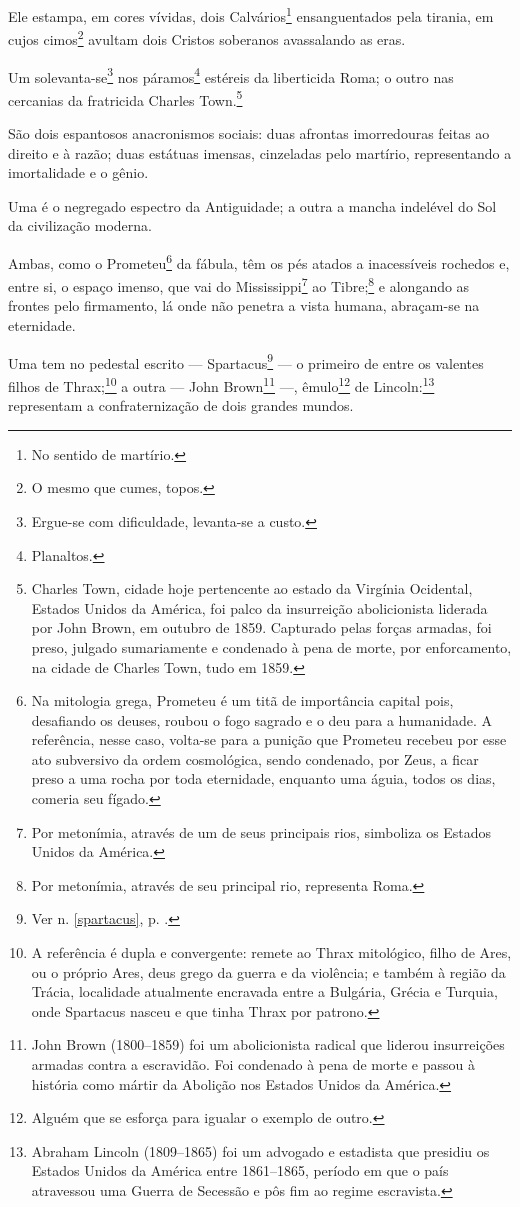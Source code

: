 Ele estampa, em cores vívidas, dois Calvários\footnote{No sentido de
  martírio.} ensanguentados pela tirania, em cujos cimos\footnote{O
  mesmo que cumes, topos.} avultam dois Cristos soberanos avassalando as
eras.

Um solevanta-se\footnote{Ergue-se com dificuldade, levanta-se a custo.}
nos páramos\footnote{Planaltos.} estéreis da liberticida Roma; o outro
nas cercanias da fratricida Charles Town.\footnote{Charles Town, cidade
  hoje pertencente ao estado da Virgínia Ocidental, Estados Unidos da
  América, foi palco da insurreição abolicionista liderada por John
  Brown, em outubro de 1859. Capturado pelas forças armadas, foi preso,
  julgado sumariamente e condenado à pena de morte, por enforcamento, na
  cidade de Charles Town, tudo em 1859.}

São dois espantosos anacronismos sociais: duas afrontas imorredouras
feitas ao direito e à razão; duas estátuas imensas, cinzeladas pelo
martírio, representando a imortalidade e o gênio.

Uma é o negregado espectro da Antiguidade; a outra a mancha indelével do
Sol da civilização moderna.

Ambas, como o Prometeu\footnote{Na mitologia grega, Prometeu é um titã \label{prometeu}
  de importância capital pois, desafiando os deuses, roubou o fogo
  sagrado e o deu para a humanidade. A referência, nesse caso, volta-se
  para a punição que Prometeu recebeu por esse ato subversivo da ordem
  cosmológica, sendo condenado, por Zeus, a ficar preso a uma rocha por
  toda eternidade, enquanto uma águia, todos os dias, comeria seu
  fígado.} da fábula, têm os pés atados a inacessíveis rochedos e, entre
si, o espaço imenso, que vai do Mississippi\footnote{Por metonímia,
  através de um de seus principais rios, simboliza os Estados Unidos da
  América.} ao Tibre;\footnote{Por metonímia, através de seu principal
  rio, representa Roma.} e alongando as frontes pelo firmamento, lá
onde não penetra a vista humana, abraçam-se na eternidade.

Uma tem no pedestal escrito --- Spartacus\footnote{Ver n. \ref{spartacus}, p. \pageref{spartacus}.} 
--- o primeiro de entre os valentes filhos de
Thrax;\footnote{A referência é dupla e convergente: remete ao Thrax
  mitológico, filho de Ares, ou o próprio Ares, deus grego da guerra e
  da violência; e também à região da Trácia, localidade atualmente
  encravada entre a Bulgária, Grécia e Turquia, onde Spartacus nasceu e
  que tinha Thrax por patrono.} a outra --- John Brown\footnote{John
  Brown (1800--1859) foi um abolicionista radical que liderou
  insurreições armadas contra a escravidão. Foi condenado à pena de
  morte e passou à história como mártir da Abolição nos Estados Unidos
  da América.} ---, êmulo\footnote{Alguém que se esforça para igualar o
  exemplo de outro.} de Lincoln:\footnote{Abraham Lincoln (1809--1865)
  foi um advogado e estadista que presidiu os Estados Unidos da América
  entre 1861--1865, período em que o país atravessou uma Guerra de
  Secessão e pôs fim ao regime escravista.\label{lincoln}} representam a
confraternização de dois grandes mundos.

